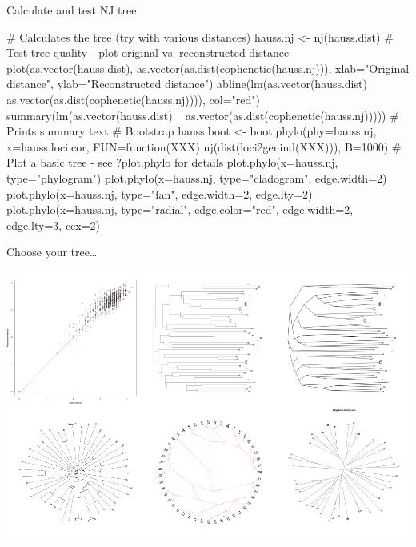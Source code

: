 \documentclass[compress, ucs, xelatex, 11pt, xcolor=svgnames,
  hyperref={
    bookmarks=true,
    unicode=true,
    colorlinks=true,
    pdftitle={Molecular data in R},
    plainpages=false,
    pdfauthor={Vojtech Zeisek},
    pdfsubject={Course about phylogeny and evolution in R},
    pdfcreator={XeLaTeX},
    pdfkeywords={R, evolution, phylogeny, molecular data},
    linkcolor=Tomato,
    anchorcolor=SaddleBrown,
    citecolor=Goldenrod,
    filecolor=DarkMagenta,
    menucolor=Sienna,
    urlcolor=DarkTurquoise,
    pdftex},
  url={hyphens, lowtilde} %
  ]{beamer}
\begin{document}
\begin{frame}[fragile]{Calculate and test NJ tree}
  \begin{spluscode}
    # Calculates the tree (try with various distances)
    hauss.nj <- nj(hauss.dist)
    # Test tree quality - plot original vs. reconstructed distance
    plot(as.vector(hauss.dist), as.vector(as.dist(cophenetic(hauss.nj))),
      xlab="Original distance", ylab="Reconstructed distance")
    abline(lm(as.vector(hauss.dist) ~
      as.vector(as.dist(cophenetic(hauss.nj)))), col="red")
    summary(lm(as.vector(hauss.dist) ~
      as.vector(as.dist(cophenetic(hauss.nj))))) # Prints summary text
    # Bootstrap
    hauss.boot <- boot.phylo(phy=hauss.nj, x=hauss.loci.cor,
      FUN=function(XXX) nj(dist(loci2genind(XXX))), B=1000)
    # Plot a basic tree - see ?plot.phylo for details
    plot.phylo(x=hauss.nj, type="phylogram")
    plot.phylo(x=hauss.nj, type="cladogram", edge.width=2)
    plot.phylo(x=hauss.nj, type="fan", edge.width=2, edge.lty=2)
    plot.phylo(x=hauss.nj, type="radial", edge.color="red",
      edge.width=2, edge.lty=3, cex=2)
  \end{spluscode}
\end{frame}

\begin{frame}{Choose your tree\ldots}
  \begin{center}
    \includegraphics[width=\textwidth-1.5cm]{nj1.png}
  \end{center}
\end{frame}
\end{document}
